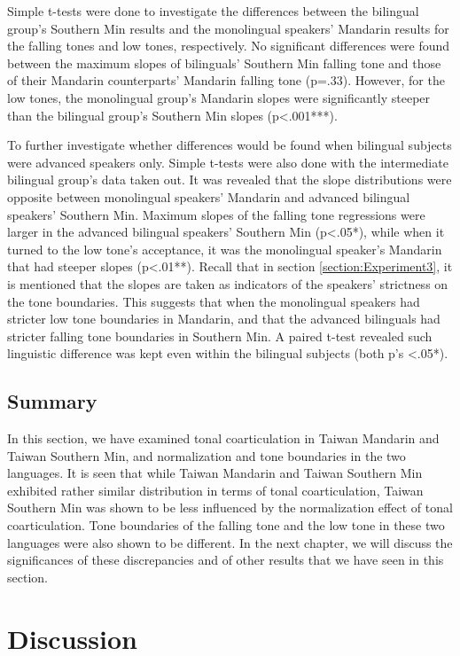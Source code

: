 \documentclass[12pt]{report}
\begin{document}
\begin{CJK}{UTF8}{bsmi}
Simple t-tests were done to investigate the differences between the bilingual group's Southern Min results and the monolingual speakers' Mandarin results for the falling tones and low tones, respectively. No significant differences were found between the maximum slopes of bilinguals' Southern Min falling tone and those of their Mandarin counterparts' Mandarin falling tone (p=.33). However, for the low tones, the monolingual group's Mandarin slopes were significantly steeper than the bilingual group's Southern Min slopes (p<.001***).

To further investigate whether differences would be found when bilingual subjects were advanced speakers only. Simple t-tests were also done with the intermediate bilingual group's data taken out. It was revealed that the slope distributions were opposite between monolingual speakers' Mandarin and advanced bilingual speakers' Southern Min. Maximum slopes of the falling tone regressions were larger in the advanced bilingual speakers' Southern Min (p<.05*), while when it turned to the low tone's acceptance, it was the monolingual speaker's Mandarin that had steeper slopes (p<.01**). Recall that in section \ref{section:Experiment3}, it is mentioned that the slopes are taken as indicators of the speakers' strictness on the tone boundaries. This suggests that when the monolingual speakers had stricter low tone boundaries in Mandarin, and that the advanced bilinguals had stricter falling tone boundaries in Southern Min. A paired t-test revealed such linguistic difference was kept even within the bilingual subjects (both p's <.05*).

\section{Summary}
In this section, we have examined tonal coarticulation in Taiwan Mandarin and Taiwan Southern Min, and normalization and tone boundaries in the two languages. It is seen that while Taiwan Mandarin and Taiwan Southern Min exhibited rather similar distribution in terms of tonal coarticulation, Taiwan Southern Min was shown to be less influenced by the normalization effect of tonal coarticulation. Tone boundaries of the falling tone and the low tone in these two languages were also shown to be different. In the next chapter, we will discuss the significances of these discrepancies and of other results that we have seen in this section.

\pagebreak
\chapter{Discussion}


\end{CJK}
\end{document}
